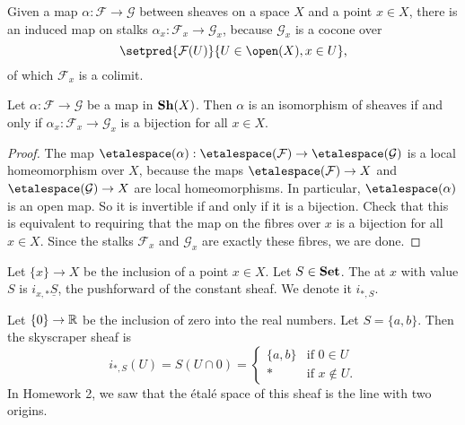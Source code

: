 Given a map $\alpha\colon \mathcal{F} \to \mathcal{G}$ between sheaves on a space $X$ and a point $x \in X$, there is an induced map on stalks $\alpha_x\colon \mathcal{F}_x \to \mathcal{G}_x$, because $\mathcal{G}_x$ is a cocone over
\[\setpred{\mathcal{F}(U)}{U \in \open(X),x \in U}\text{,}\]
of which $\mathcal{F}_x$ is a colimit. 

\begin{lem}\label{lem:stalkwise-check-isomorphism}
    Let $\alpha\colon \mathcal{F} \to \mathcal{G}$ be a map in $\operatorname{\mathbf{Sh}}(X)$. 
    Then $\alpha$ is an isomorphism of sheaves if and only if $\alpha_x\colon \mathcal{F}_x \to \mathcal{G}_x$ is a bijection for all $x \in X$. 
\end{lem}
\begin{proof}
    The map $\etalespace(\alpha)\colon \etalespace(\mathcal{F}) \to \etalespace(\mathcal{G})$ is a local homeomorphism over $X$, because the maps $\etalespace(\mathcal{F}) \to X$ and $\etalespace(\mathcal{G}) \to X$ are local homeomorphisms. In particular, $\etalespace(\alpha)$ is an open map. So it is invertible if and only if it is a bijection. Check that this is equivalent to requiring that the map on the fibres over $x$ is a bijection for all $x \in X$. Since the stalks $\mathcal{F}_x$ and $\mathcal{G}_x$ are exactly these fibres, we are done. 
\end{proof}

\begin{defn}
    Let $\{x\} \to X$ be the inclusion of a point $x \in X$. Let $S \in \mathbf{Set}$. The  at $x$ with value $S$ is $i_{x,*}\underline{S}$, the pushforward of the constant sheaf. We denote it $i_{*, S}$.
\end{defn}

\begin{exmp}
    Let $\{0\} \to \mathbb{R}$ be the inclusion of zero into the real numbers. Let $S = \{a,b\}$. Then the skyscraper sheaf is 
    \[
        i_{*,S}(U) = S(U \cap 0) =     \begin{cases}
        \{a,b\} & \text{if } 0 \in U\\
        * & \text{if } x \notin U.
    \end{cases}
    \]
    In Homework 2, we saw that the étalé space of this sheaf is the line with two origins. 
\end{exmp}